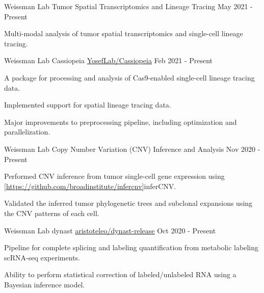

\begin{cventries}

\cventry
  {Weissman Lab} %
  {Tumor Spatial Transcriptomics and Lineage Tracing} %
  {} %
  {May 2021 - Present} %
  {
    \begin{cvitems} %
      \item {Multi-modal analysis of tumor spatial transcriptomics and single-cell lineage tracing.}
    \end{cvitems}
  }


\cventry
  {Weissman Lab} %
  {Cassiopeia} %
  {\faGithub\phantom{a}\href{https://github.com/YosefLab/Cassiopeia}{YosefLab/Cassiopeia}} %
  {Feb 2021 - Present} %
  {
    \begin{cvitems} %
      \item {A package for processing and analysis of Cas9-enabled single-cell lineage tracing data.}
      \item {Implemented support for spatial lineage tracing data.}
      \item {Major improvements to preprocessing pipeline, including optimization and parallelization.}
    \end{cvitems}
  }

\cventry
  {Weissman Lab} %
  {Copy Number Variation (CNV) Inference and Analysis} %
  {}
  {Nov 2020 - Present}
  {
    \begin{cvitems} %
      \item {Performed CNV inference from tumor single-cell gene expression using \ref{https://github.com/broadinstitute/infercnv}{inferCNV}.}
      \item {Validated the inferred tumor phylogenetic trees and subclonal expansions using the CNV patterns of each cell.}
    \end{cvitems}
  }

\cventry
  {Weissman Lab} %
  {dynast} %
  {\faGithub\phantom{a}\href{https://github.com/aristoteleo/dynast-release}{aristoteleo/dynast-release}} %
  {Oct 2020 - Present} %
  {
    \begin{cvitems} %
      \item {Pipeline for complete splicing and labeling quantification from metabolic labeling scRNA-seq experiments.}
      \item {Ability to perform statistical correction of labeled/unlabeled RNA using a Bayesian inference model.}
    \end{cvitems}
  }



\end{cventries}
